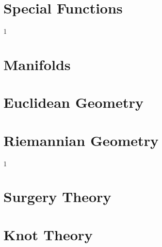 \documentclass{book}                                                           %
\newcommand*{\TOPPATH}{books}
\newcommand*{\PATH}{\TOPPATH/}
\newcounter{endpage}
\def\compilegeometry{1}
\def\compilegeotop{1}
\begin{document}
            \part{Special Functions}
                
                
        \clearpage
        \setcounter{endpage}{\thepage}
    \fi

    \if\compilegeometry1
            \label{book:Geometry}%
            \renewcommand{\PATH}{\TOPPATH/Geometry}
            \setcounter{page}{\value{endpage}}
            \part{Manifolds}
                
            \part{Euclidean Geometry}
                
            \part{Riemannian Geometry}
                
        \clearpage
        \setcounter{endpage}{\thepage}
    \fi

    \if\compilegeotop1
            \label{book:Geometric_Topology}%
            \renewcommand{\PATH}{\TOPPATH/Geometric_Topology}
            \setcounter{page}{\value{endpage}}
            \part{Surgery Theory}
                
            \part{Knot Theory}
                
        \clearpage
        \setcounter{endpage}{\thepage}
    \fi
\end{document}
